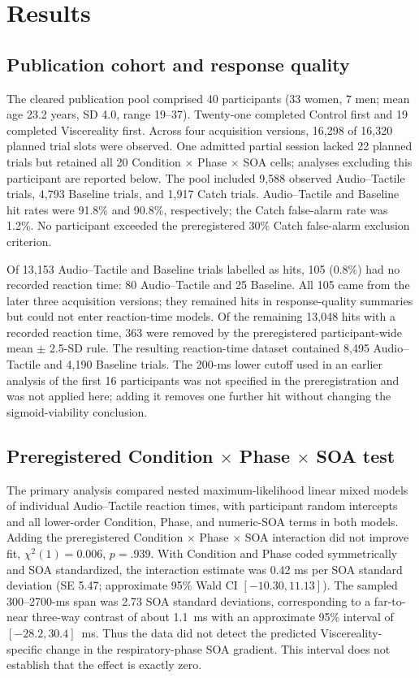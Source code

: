 \section{Results}

\subsection{Publication cohort and response quality}

The cleared publication pool comprised 40 participants (33 women, 7 men; mean age 23.2 years, SD 4.0, range 19--37). Twenty-one completed Control first and 19 completed Viscereality first. Across four acquisition versions, 16{,}298 of 16{,}320 planned trial slots were observed. One admitted partial session lacked 22 planned trials but retained all 20 Condition $\times$ Phase $\times$ SOA cells; analyses excluding this participant are reported below. The pool included 9{,}588 observed Audio--Tactile trials, 4{,}793 Baseline trials, and 1{,}917 Catch trials. Audio--Tactile and Baseline hit rates were 91.8\% and 90.8\%, respectively; the Catch false-alarm rate was 1.2\%. No participant exceeded the preregistered 30\% Catch false-alarm exclusion criterion.

Of 13{,}153 Audio--Tactile and Baseline trials labelled as hits, 105 (0.8\%) had no recorded reaction time: 80 Audio--Tactile and 25 Baseline. All 105 came from the later three acquisition versions; they remained hits in response-quality summaries but could not enter reaction-time models. Of the remaining 13{,}048 hits with a recorded reaction time, 363 were removed by the preregistered participant-wide mean $\pm$ 2.5-SD rule. The resulting reaction-time dataset contained 8{,}495 Audio--Tactile and 4{,}190 Baseline trials. The 200-ms lower cutoff used in an earlier analysis of the first 16 participants was not specified in the preregistration and was not applied here; adding it removes one further hit without changing the sigmoid-viability conclusion.

\subsection{Preregistered \texorpdfstring{Condition $\times$ Phase $\times$ SOA}{Condition x Phase x SOA} test}

The primary analysis compared nested maximum-likelihood linear mixed models of individual Audio--Tactile reaction times, with participant random intercepts and all lower-order Condition, Phase, and numeric-SOA terms in both models. Adding the preregistered Condition $\times$ Phase $\times$ SOA interaction did not improve fit, $\chi^{2}(1)=0.006$, $p=.939$. With Condition and Phase coded symmetrically and SOA standardized, the interaction estimate was 0.42 ms per SOA standard deviation (SE 5.47; approximate 95\% Wald CI $[-10.30, 11.13]$). The sampled 300--2700-ms span was 2.73 SOA standard deviations, corresponding to a far-to-near three-way contrast of about 1.1~ms with an approximate 95\% interval of $[-28.2, 30.4]$~ms. Thus the data did not detect the predicted Viscereality-specific change in the respiratory-phase SOA gradient. This interval does not establish that the effect is exactly zero.

